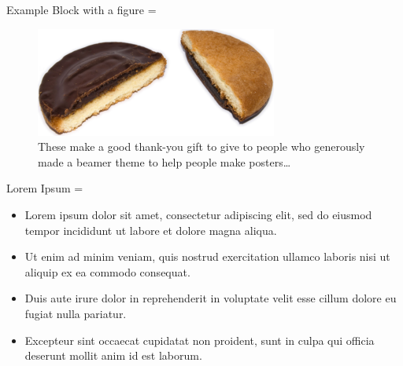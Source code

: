 \documentclass[final,hyperref={pdfpagelabels=false}]{beamer}
\newcommand{\correctitemizeindent}{\setlength{\leftmargini}{2.5em}}
\newlength{\columnheight}
\begin{document}
\begin{frame}
\begin{columns}[T]
 	\begin{column}{.32\textwidth}
		\begin{minipage}[t]{.95\textwidth}
		\parbox[t][\columnheight]{\textwidth}{	  
			
			\begin{rightColumnBlock}{Example Block with a figure}
				\correctitemizeindent
				\rightskip=\leftskip
				\begin{center}
				\begin{minipage}{0.95\textwidth}
				\begin{figure} \label{fig:memory-transform}
					\begin{center}
						\includegraphics[width=\textwidth]{graphics/jaffa_cake}
					\end{center}
				\caption{These make a good thank-you gift to give to people who generously made a beamer theme to help people make posters\dots}
				\end{figure}
				\end{minipage}
				\end{center}				
			\end{rightColumnBlock}
			
			\vfill
			
			\begin{rightColumnBlock}{Lorem Ipsum}
			\rightskip=\leftskip
			{\correctitemizeindent
			\begin{itemize}
				\item Lorem ipsum dolor sit amet, consectetur adipiscing elit, sed do eiusmod tempor incididunt ut labore et dolore magna aliqua.
				\item Ut enim ad minim veniam, quis nostrud exercitation ullamco laboris nisi ut aliquip ex ea commodo consequat.
				\item Duis aute irure dolor in reprehenderit in voluptate velit esse cillum dolore eu fugiat nulla pariatur.
				\item Excepteur sint occaecat cupidatat non proident, sunt in culpa qui officia deserunt mollit anim id est laborum.
			\end{itemize}
			}
			\end{rightColumnBlock}
			
}
\end{minipage}
\end{column}
\end{columns}
\end{frame}
\end{document}
